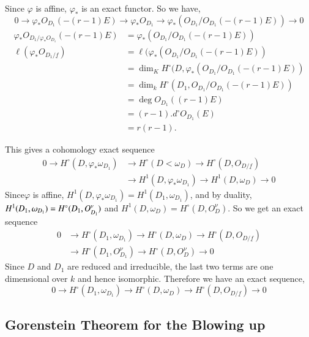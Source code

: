 Since $\varphi$ is affine, $\varphi_*$ is an exact functor. So we
have,
$$
0\longrightarrow\varphi_*O_{D_1}(-(r-1)E)\longrightarrow\varphi_*O_{D_1}
\longrightarrow\varphi_*(O_{D_1}/O_{D_1}(-(r-1)E))\longrightarrow 0
$$
\ie
\begin{align*}
\varphi_*O_{D_1/\varphi_*O_{D_1}}(-(r-1)E) &=
\varphi_*(O_{D_1}/O_{D_1}(-(r-1)E))\\
\ell(\varphi_*O_{D_1/\underline{f}}) &= \ell
(\varphi_*(O_{D_1}/O_{D_1}(-(r-1)E))\\
&= \dim_KH^\circ(D,\varphi_*(O_{D_1}/O_{D_1}(-(r-1)E))\\
&= \dim_kH^\circ(D_1,O_{D_1}/O_{D_1}(-(r-1)E))\\
&= \deg O_{D_1}((r-1)E)\\
&= (r-1).d^\circ O_{D_1}(E)\\
&= r(r-1).
\end{align*}

This gives a cohomology exact sequence
\begin{align*}
0\longrightarrow H^\circ(D,\varphi_*\omega_{D_1}) &\longrightarrow
H^\circ(D<\omega_D)\longrightarrow H^\circ(D,O_{D/\underline{f}})\\
&\longrightarrow H^1(D,\varphi_*\omega_{D_1})\longrightarrow H^1(D,
\omega_D)\longrightarrow 0
\end{align*}
Since\pageoriginale $\varphi$ is affine,
$H^1(D,\varphi_*\omega_{D_1})=H^1(D_1,\omega_{D_1})$, and by duality,
$H^1(D_1,\break\omega_{D_1})=H^\circ(D_1, O_{D_1}^\nu)$ and
$H^1(D,\omega_D)=H^\circ(D, O_D^\nu)$. So we get an exact sequence
\begin{align*}
0 &\longrightarrow H^\circ(D_1,\omega_{D_1})\longrightarrow H^\circ(D,
\omega_D)\longrightarrow H^\circ(D, O_{D/\underline{f}})\\
&\longrightarrow H^\circ(D_1,O_{D_1}^\nu)\longrightarrow H^\circ(D,
O_D^\nu)\longrightarrow 0
\end{align*}
Since $D$ and $D_1$ are reduced and irreducible, the last
two terms are one dimensional over $k$ and hence isomorphic. Therefore
we have an exact sequence,
$$
0 \longrightarrow H^\circ(D_1,\omega_{D_1})\longrightarrow H^\circ(D,
\omega_D) \longrightarrow H^\circ(D,
O_{D/\underline{f}})\longrightarrow 0
$$

\subsection[Gorenstein Theorem]{Gorenstein Theorem for the Blowing
  up}\label{chap2:ssec5.1}

